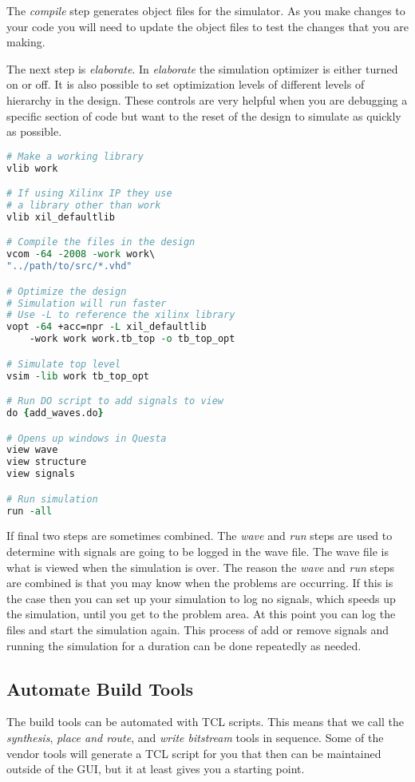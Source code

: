 The \emph{compile} step generates object files for the simulator. As you make changes to your code you will need to update the object files to test the changes that you are making. 

The next step is \emph{elaborate}. In \emph{elaborate} the simulation optimizer is either turned on or off. It is also possible to set optimization levels of different levels of hierarchy in the design. These controls are very helpful when you are debugging a specific section of code but want to the reset of the design to simulate as quickly as possible.

\begin{lstlisting}[language=tcl]
# Make a working library
vlib work

# If using Xilinx IP they use
# a library other than work
vlib xil_defaultlib

# Compile the files in the design
vcom -64 -2008 -work work\
"../path/to/src/*.vhd"

# Optimize the design
# Simulation will run faster
# Use -L to reference the xilinx library
vopt -64 +acc=npr -L xil_defaultlib 
    -work work work.tb_top -o tb_top_opt

# Simulate top level	
vsim -lib work tb_top_opt

# Run DO script to add signals to view
do {add_waves.do}

# Opens up windows in Questa
view wave
view structure
view signals

# Run simulation
run -all
\end{lstlisting}

If final two steps are sometimes combined. The \emph{wave} and \emph{run} steps are used to determine with signals are going to be logged in the wave file. The wave file is what is viewed when the simulation is over. The reason the \emph{wave} and \emph{run} steps are combined is that you may know when the problems are occurring. If this is the case then you can set up your simulation to log no signals, which speeds up the simulation, until you get to the problem area. At this point you can log the files and start the simulation again. This process of add or remove signals and running the simulation for a duration can be done repeatedly as needed. 
	
\subsection{Automate Build Tools}

The build tools can be automated with \ac{TCL} scripts. This means that we call the \emph{synthesis}, \emph{place and route}, and \emph{write bitstream} tools in sequence. Some of the vendor tools will generate a \ac{TCL} script for you that then can be maintained outside of the \ac{GUI}, but it at least gives you a starting point. 

